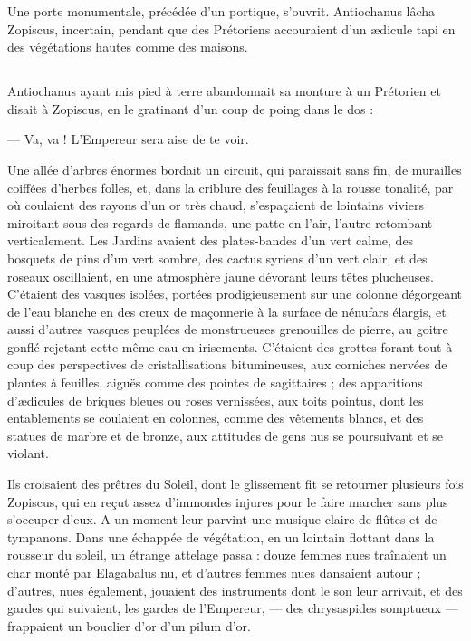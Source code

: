 \documentclass[a4paper, 11pt, oneside, polutonikogreek, french]{article}
\begin{document}
Une porte monumentale, précédée d'un portique, s'ouvrit. Antiochanus lâcha Zopiscus, incertain, pendant que des Prétoriens accouraient d'un ædicule tapi en des végétations hautes comme des maisons.
\clearpage
\subsection{}
\paragraph{}
Antiochanus ayant mis pied à terre abandonnait sa monture à un Prétorien et disait à Zopiscus, en le gratinant d'un coup de poing dans le dos :

--- Va, va ! L'Empereur sera aise de te voir.

Une allée d'arbres énormes bordait un circuit, qui paraissait sans fin, de murailles coiffées d'herbes folles, et, dans la criblure des feuillages à la rousse tonalité, par où coulaient des rayons d'un or très chaud, s'espaçaient de lointains viviers miroitant sous des regards de flamands, une patte en l'air, l'autre retombant verticalement. Les Jardins avaient des plates-bandes d'un vert calme, des bosquets de pins d'un vert sombre, des cactus syriens d'un vert clair, et des roseaux oscillaient, en une atmosphère jaune dévorant leurs têtes plucheuses. C'étaient des vasques isolées, portées prodigieusement sur une colonne dégorgeant de l'eau blanche en des creux de maçonnerie à la surface de nénufars élargis, et aussi d'autres vasques peuplées de monstrueuses grenouilles de pierre, au goitre gonflé rejetant cette même eau en irisements. C'étaient des grottes forant tout à coup des perspectives de cristallisations bitumineuses, aux corniches nervées de plantes à feuilles, aiguës comme des pointes de sagittaires ; des apparitions d'ædicules de briques bleues ou roses vernissées, aux toits pointus, dont les entablements se coulaient en colonnes, comme des vêtements blancs, et des statues de marbre et de bronze, aux attitudes de gens nus se poursuivant et se violant.

Ils croisaient des prêtres du Soleil, dont le glissement fit se retourner plusieurs fois Zopiscus, qui en reçut assez d'immondes injures pour le faire marcher sans plus s'occuper d'eux. A un moment leur parvint une musique claire de flûtes et de tympanons. Dans une échappée de végétation, en un lointain flottant dans la rousseur du soleil, un étrange attelage passa : douze femmes nues traînaient un char monté par Elagabalus nu, et d'autres femmes nues dansaient autour ; d'autres, nues également, jouaient des instruments dont le son leur arrivait, et des gardes qui suivaient, les gardes de l'Empereur, --- des chrysaspides somptueux --- frappaient un bouclier d'or d'un pilum d'or.
\end{document}
